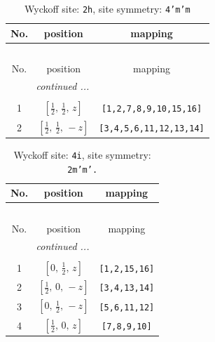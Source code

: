 \documentclass[fleqn,8pt]{jsarticle}
\begin{document}
\begin{longtable}{ccc}
\caption{Wyckoff site: {\tt 2h}, site symmetry: {\tt 4'm'm}}
 \\
 \hline \hline
No. & position & mapping \\ \hline \endfirsthead

\multicolumn{2}{l}{\tablename\ \thetable{}} \\
 \hline \hline
No. & position & mapping \\ \hline \endhead

 \hline \hline
\multicolumn{2}{r}{\footnotesize\it continued ...} \\ \endfoot

 \hline \hline
\multicolumn{2}{r}{} \\ \endlastfoot

1 & $\left[ \frac{1}{2},\, \frac{1}{2},\, z \right]$ & {\tt [1,2,7,8,9,10,15,16]} \\ \hline
2 & $\left[ \frac{1}{2},\, \frac{1}{2},\, - z \right]$ & {\tt [3,4,5,6,11,12,13,14]} \\
\end{longtable}
\renewcommand{\arraystretch}{1.2}
\begin{longtable}{ccc}
\caption{Wyckoff site: {\tt 4i}, site symmetry: {\tt 2m'm'.}}
 \\
 \hline \hline
No. & position & mapping \\ \hline \endfirsthead

\multicolumn{2}{l}{\tablename\ \thetable{}} \\
 \hline \hline
No. & position & mapping \\ \hline \endhead

 \hline \hline
\multicolumn{2}{r}{\footnotesize\it continued ...} \\ \endfoot

 \hline \hline
\multicolumn{2}{r}{} \\ \endlastfoot

1 & $\left[ 0,\, \frac{1}{2},\, z \right]$ & {\tt [1,2,15,16]} \\ \hline
2 & $\left[ \frac{1}{2},\, 0,\, - z \right]$ & {\tt [3,4,13,14]} \\ \hline
3 & $\left[ 0,\, \frac{1}{2},\, - z \right]$ & {\tt [5,6,11,12]} \\ \hline
4 & $\left[ \frac{1}{2},\, 0,\, z \right]$ & {\tt [7,8,9,10]} \\
\end{longtable}
\renewcommand{\arraystretch}{1.2}
\end{document}
